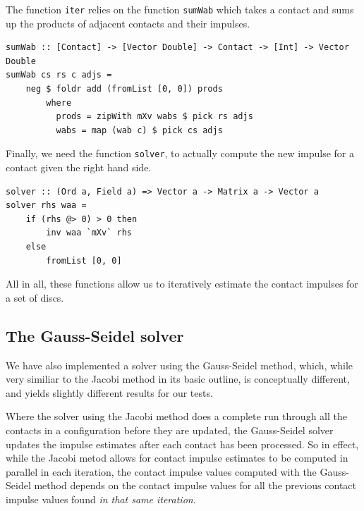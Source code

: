 \documentclass[runningheads,a4paper]{llncs}
\begin{document}
The function \verb+iter+ relies on the function \verb+sumWab+ which takes a
contact and sums up the products of adjacent contacts and their impulses.
\begin{verbatim}
sumWab :: [Contact] -> [Vector Double] -> Contact -> [Int] -> Vector Double
sumWab cs rs c adjs =
    neg $ foldr add (fromList [0, 0]) prods
        where
          prods = zipWith mXv wabs $ pick rs adjs
          wabs = map (wab c) $ pick cs adjs
\end{verbatim}

Finally, we need the function \verb+solver+, to actually compute the new
impulse for a contact given the right hand side.
\begin{verbatim}
solver :: (Ord a, Field a) => Vector a -> Matrix a -> Vector a
solver rhs waa =
    if (rhs @> 0) > 0 then
        inv waa `mXv` rhs
    else
        fromList [0, 0]
\end{verbatim}

All in all, these functions allow us to iteratively estimate the contact
impulses for a set of discs.

\subsection{The Gauss-Seidel solver}

We have also implemented a solver using the Gauss-Seidel method, which, while
very similiar to the Jacobi method in its basic outline, is conceptually
different, and yields slightly different results for our tests.

Where the solver using the Jacobi method does a complete run through all the
contacts in a configuration before they are updated, the Gauss-Seidel solver
updates the impulse estimates after each contact has been processed. So in
effect, while the Jacobi metod allows for contact impulse estimates to be
computed in parallel in each iteration, the contact impulse values computed
with the Gauss-Seidel method depends on the contact impulse values for all the
previous contact impulse values found \emph{in that same iteration}.
\end{document}
